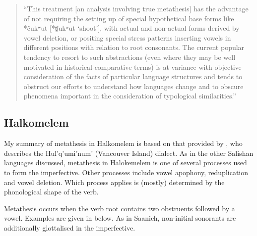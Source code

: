 \begin{quote}
``This treatment [an analysis involving true metathesis]
has the advantage of not requiring the setting up of special
hypothetical base forms like *čukʷut [*ʧukʷut `shoot'],
with actual and non-actual forms derived by vowel deletion,
or positing special stress patterns inserting vowels in different positions with relation to root consonants.
The current popular tendency to resort to such abstractions
(even where they may be well motivated in historical-comparative terms)
is at variance with objective consideration
of the facts of particular language structures
and tends to obstruct our efforts to understand how languages change
and to obscure phenomena important in the consideration of typological similarities.'' %
\end{quote}		

\subsection{Halkomelem}\label{sec:Hal}
My summary of metathesis in Halkomelem is based on that provided by \cite{ur11},
who describes the Hul'q'umi'num' (Vancouver Island) dialect.
As in the other Salishan languages discussed,
metathesis in Halokemelem is one of several processes used to form the imperfective.
Other processes include vowel apophony, reduplication and vowel deletion.
Which process applies is (mostly) determined by the phonological shape of the verb.

Metathesis occurs when the verb root contains two obstruents followed by a vowel.
Examples are given in  below.
As in Saanich, non-initial sonorants
are additionally glottalised in the imperfective.

\begin{exe}
	\label{ex:HalCCV{\ra}CVC}
\end{exe}

